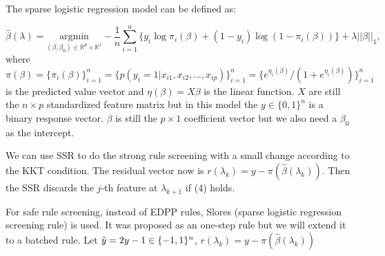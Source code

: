 \documentclass{article}
\begin{document}
The sparse logistic regression model can be defined as:

\begin{equation}
    \hat{\beta}(\lambda)=\underset{(\beta,\beta_0)\in \mathbb{R}^p\times\mathbb{R}^1}{\mathrm{argmin}}-\frac{1}{n}\sum_{i=1}^n\{y_i\log\pi_i(\beta)+(1-y_i)\log(1-\pi_i(\beta))\}+\lambda||\beta||_1,
\end{equation}
where $\pi(\beta)=\{\pi_i(\beta)\}_{i=1}^n=\{p(y_i=1|x_{i1},x_{i2},...,x_{ip})\}_{i=1}^n=\{e^{\eta_i(\beta)}/(1+e^{\eta_i(\beta)})\}_{i=1}^n$ is the predicted value vector and $\eta(\beta)=X\beta$ is the linear function. $X$ are still the $n\times p$ standardized feature matrix  but in this model the $y\in\{0,1\}^n$ is a binary response vector. $\beta$ is still the $p\times1$ coefficient vector but we also need a $\beta_0$ as the intercept.

We can use SSR to do the strong rule screening with a small change according to the KKT condition. The residual vector now is $r(\lambda_k)=y-\pi(\hat{\beta}(\lambda_k))$. Then the SSR discards the $j$-th feature at $\lambda_{k+1}$ if (4) holds.

For safe rule screening, instead of EDPP rules, Slores (sparse logistic regression screening rule)\cite{wang2014safe} is used. It was proposed as an one-step rule but we will extend it to a batched rule. Let $\Tilde{y}=2y-1\in\{-1,1\}^n$, $r(\lambda_k)=y-\pi(\hat{\beta}(\lambda_k))$
\end{document}

